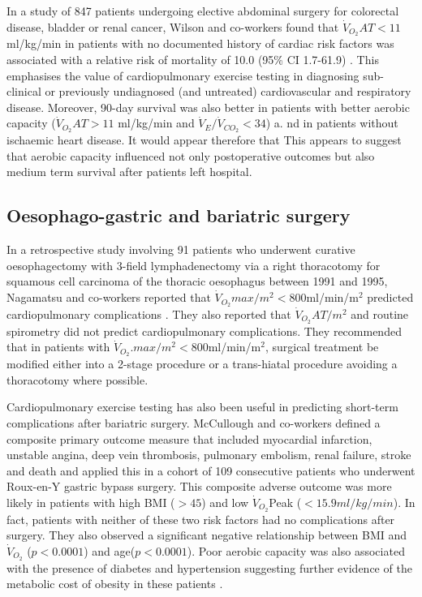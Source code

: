 In a study of 847 patients undergoing elective abdominal surgery for colorectal disease, bladder or renal cancer, Wilson and co-workers found that $\dot{V}_{O_2}AT<11$ ml/kg/min in patients with no documented history of cardiac risk factors was associated with a relative risk of mortality of 10.0 (95\% CI 1.7-61.9) \parencite{wilson_impaired_2010}. 
This emphasises the value of cardiopulmonary exercise testing in diagnosing sub-clinical or previously undiagnosed (and untreated) cardiovascular and respiratory disease. 
Moreover, 90-day survival was also better in patients with better aerobic capacity ($\dot{V}_{O_2}AT>11$ ml/kg/min and $\dot{V}_E/\dot{V}_{CO_2}<34$) {a}. 
nd in patients without ischaemic heart disease. 
It would appear therefore that This appears to suggest that aerobic capacity influenced not only postoperative outcomes but also medium term survival after patients left hospital.

\subsection{Oesophago-gastric and bariatric surgery}
In a retrospective study involving 91 patients who underwent curative oesophagectomy with 3-field lymphadenectomy via a
right thoracotomy for squamous cell carcinoma of the thoracic oesophagus between 1991 and 1995, Nagamatsu and co-workers reported that $\dot{V}_{O_2}max/m^2<800$ml/min/m$^2$ predicted cardiopulmonary complications \parencite{nagamatsu_preoperative_2001}. 
They also reported that $\dot{V}_{O_2}AT/m^2$ and routine spirometry did not predict cardiopulmonary complications. 
They recommended that in patients with $\dot{V}_{O_2}. 
max/m^2<800$ml/min/m$^2$, surgical treatment be modified either into a 2-stage procedure or a trans-hiatal procedure avoiding a thoracotomy where possible.

Cardiopulmonary exercise testing has also been useful in predicting short-term complications after bariatric surgery. 
McCullough and co-workers defined a composite primary outcome measure that included myocardial infarction, unstable angina, deep vein thrombosis, pulmonary embolism, renal failure, stroke and death and applied this in a cohort of 109 consecutive patients who underwent Roux-en-Y gastric bypass surgery. 
This composite adverse outcome was more likely in patients with high BMI ($>45$) and low $\dot{V}_{O_2}$Peak ($<15.9 ml/kg/min$). 
In fact, patients with neither of these two risk factors had no complications after surgery. 
They also observed a significant negative relationship between BMI and $\dot{V}_{O_2}$ ($p<0.0001$) and age($p<0.0001$). 
Poor aerobic capacity was also associated with the presence of diabetes and hypertension suggesting further evidence of the metabolic cost of obesity in these patients \parencite{mccullough_cardiorespiratory_2006}. 

